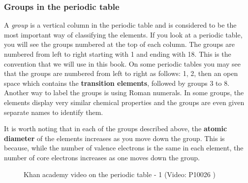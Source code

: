             \subsubsection{ Groups in the periodic table}
            \nopagebreak
            \label{m38760*id261554}A \textsl{group} is a vertical column in the periodic table and is considered to be the most important way of classifying the elements. If you look at a periodic table, you will see the groups numbered at the top of each column. The groups are numbered from left to right starting with 1 and ending with 18. This is the convention that we will use in this book. On some periodic tables you may see that the groups are numbered from left to right as follows: 1, 2, then an open space which contains the \textbf{transition elements}, followed by groups 3 to 8. Another way to label the groups is using Roman numerals. In some groups, the elements display very similar chemical properties and the groups are even given separate names to identify them.\par 
        \label{m38760*id261833}It is worth noting that in each of the groups described above, the \textbf{atomic diameter} of the elements increases as you move down the group. This is because, while the number of valence electrons is the same in each element, the number of core electrons increases as one moves down the group.\par \label{m38760*eip-148}
    \setcounter{subfigure}{0}
	\begin{figure}[H] %
    \textnormal{Khan academy video on the periodic table - 1}\vspace{.1in} \nopagebreak
  \label{m38760*yt-media1}\label{m38760*yt-video1}
             { (Video:  P10026 )}
      \vspace{2pt}
    \vspace{.1in}
 \end{figure}       \par 
      \label{m38760*uid146}
